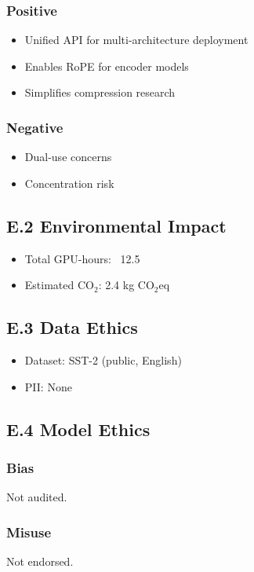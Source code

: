 {\subsubsection{Positive}
\begin{itemize}
\item Unified API for multi-architecture deployment
\item Enables RoPE for encoder models
\item Simplifies compression research

\end{itemize}
\subsubsection{Negative}
\begin{itemize}
\item Dual-use concerns
\item Concentration risk

\end{itemize}
\subsection{E.2 Environmental Impact}

\begin{itemize}
\item Total GPU-hours: ~12.5
\item Estimated CO$_2$: 2.4 kg CO$_2$eq

\end{itemize}
\subsection{E.3 Data Ethics}

\begin{itemize}
\item Dataset: SST-2 (public, English)
\item PII: None

\end{itemize}
\subsection{E.4 Model Ethics}

\subsubsection{Bias}
Not audited.

\subsubsection{Misuse}
Not endorsed.

}
